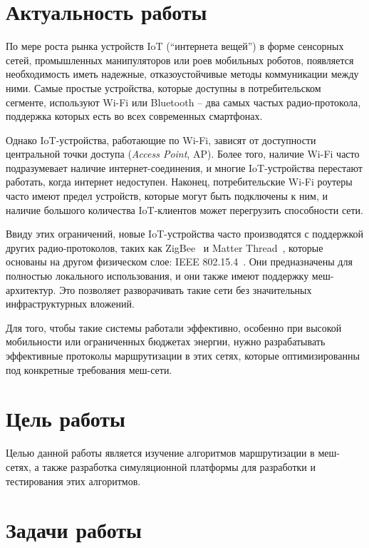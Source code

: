\documentclass[%
]{report}
\begin{document}
\section{Актуальность работы}

По мере роста рынка устройств IoT (``интернета вещей'')
в форме сенсорных сетей, промышленных манипуляторов или роев мобильных роботов,
появляется необходимость иметь надежные, отказоустойчивые методы
коммуникации между ними.
Самые простые устройства, которые доступны в потребительском сегменте,
используют Wi-Fi или Bluetooth -- два самых частых радио-протокола,
поддержка которых есть во всех современных смартфонах.

Однако IoT-устройства, работающие по Wi-Fi, зависят от доступности центральной точки доступа (\emph{Access Point}, AP).
Более того, наличие Wi-Fi часто подразумевает наличие интернет-соединения,
и многие IoT-устройства перестают работать, когда интернет недоступен.
Наконец, потребительские Wi-Fi роутеры часто имеют предел устройств, которые могут быть подключены к ним,
и наличие большого количества IoT-клиентов может перегрузить способности сети.

Ввиду этих ограничений, новые IoT-устройства часто производятся с поддержкой других
радио-протоколов, таких как ZigBee~\cite{zigbee-792946} и Matter Thread~\cite{csa2023thread},
которые основаны на другом физическом слое: IEEE 802.15.4~\cite{ieee-lorawan-9144691}.
Они предназначены для полностью локального использования,
и они также имеют поддержку меш-архитектур.
Это позволяет разворачивать такие сети без значительных инфраструктурных вложений.

Для того, чтобы такие системы работали эффективно,
особенно при высокой мобильности или ограниченных бюджетах энергии,
нужно разрабатывать эффективные протоколы маршрутизации в этих сетях,
которые оптимизированны под конкретные требования меш-сети.

\section{Цель работы}

Целью данной работы является изучение алгоритмов маршрутизации в меш-сетях,
а также разработка симуляционной платформы для разработки и тестирования этих алгоритмов.

\section{Задачи работы}
\end{document}
